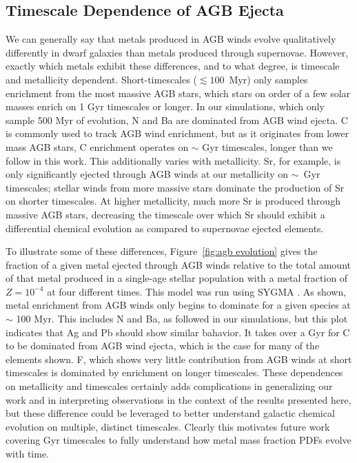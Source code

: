 \documentclass[twocolumn]{aastex61}
\begin{document}





\subsection{Timescale Dependence of AGB Ejecta}
\label{sec:discussion:metal yields}
We can generally say that metals produced in AGB winds evolve qualitatively differently in dwarf galaxies than metals produced through supernovae. However, exactly which metals exhibit these differences, and to what degree, is timescale and metallicity dependent. Short-timescales ($\lesssim 100$~Myr) only samples enrichment from the most massive AGB stars, which stars on order of a few solar masses enrich on 1 Gyr timescales or longer. In our simulations, which only sample 500 Myr of evolution, N and Ba are dominated from AGB wind ejecta. C is commonly used to track AGB wind enrichment, but as it originates from lower mass AGB stars, C enrichment operates on $\sim$ Gyr timescales, longer than we follow in this work. This additionally varies with metallicity. Sr, for example, is only significantly ejected through AGB winds at our metallicity on $\sim$~Gyr timescales; stellar winds from more massive stars dominate the production of Sr on shorter timescales. At higher metallicity, much more Sr is produced through massive AGB stars, decreasing the timescale over which Sr should exhibit a differential chemical evolution as compared to supernovae ejected elements.

To illustrate some of these differences, Figure~\ref{fig:agb evolution} gives the fraction of a given metal ejected through AGB winds relative to the total amount of that metal produced in a single-age stellar population with a metal fraction of $Z = 10^{-4}$ at four different times. This model was run using \textsc{SYGMA} \citep{Ritter2017}. As shown, metal enrichment from AGB winds only begins to dominate for a given species at $\sim$ 100 Myr. This includes N and Ba, as followed in our simulations, but this plot indicates that Ag and Pb should show similar bahavior. It takes over a Gyr for C to be dominated from AGB wind ejecta, which is the case for many of the elements shown. F, which shows very little contribution from AGB winds at short timescales is dominated by enrichment on longer timescales. These dependences on metallicity and timescales certainly adds complications in generalizing our work and in interpreting observations in the context of the results presented here, but these difference could be leveraged to better understand galactic chemical evolution on multiple, distinct timescales. Clearly this motivates future work covering Gyr timescales to fully understand how metal mass fraction PDFs evolve with time.
\end{document}

